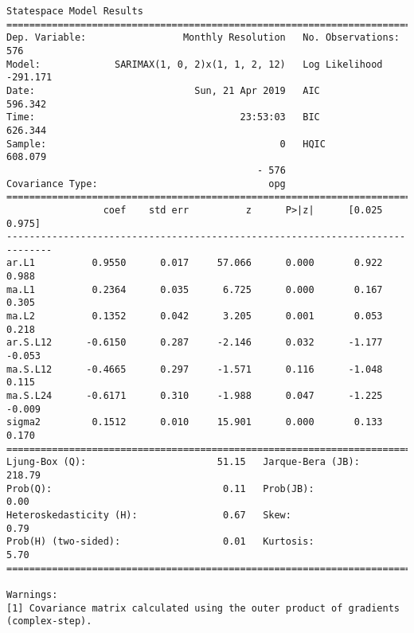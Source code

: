 \documentclass[11pt]{article}
\begin{document}
    \begin{Verbatim}[commandchars=\\\{\}]
                                 Statespace Model Results                                 
==========================================================================================
Dep. Variable:                 Monthly Resolution   No. Observations:                  576
Model:             SARIMAX(1, 0, 2)x(1, 1, 2, 12)   Log Likelihood                -291.171
Date:                            Sun, 21 Apr 2019   AIC                            596.342
Time:                                    23:53:03   BIC                            626.344
Sample:                                         0   HQIC                           608.079
                                            - 576                                         
Covariance Type:                              opg                                         
==============================================================================
                 coef    std err          z      P>|z|      [0.025      0.975]
------------------------------------------------------------------------------
ar.L1          0.9550      0.017     57.066      0.000       0.922       0.988
ma.L1          0.2364      0.035      6.725      0.000       0.167       0.305
ma.L2          0.1352      0.042      3.205      0.001       0.053       0.218
ar.S.L12      -0.6150      0.287     -2.146      0.032      -1.177      -0.053
ma.S.L12      -0.4665      0.297     -1.571      0.116      -1.048       0.115
ma.S.L24      -0.6171      0.310     -1.988      0.047      -1.225      -0.009
sigma2         0.1512      0.010     15.901      0.000       0.133       0.170
===================================================================================
Ljung-Box (Q):                       51.15   Jarque-Bera (JB):               218.79
Prob(Q):                              0.11   Prob(JB):                         0.00
Heteroskedasticity (H):               0.67   Skew:                             0.79
Prob(H) (two-sided):                  0.01   Kurtosis:                         5.70
===================================================================================

Warnings:
[1] Covariance matrix calculated using the outer product of gradients (complex-step).

    \end{Verbatim}
\end{document}
